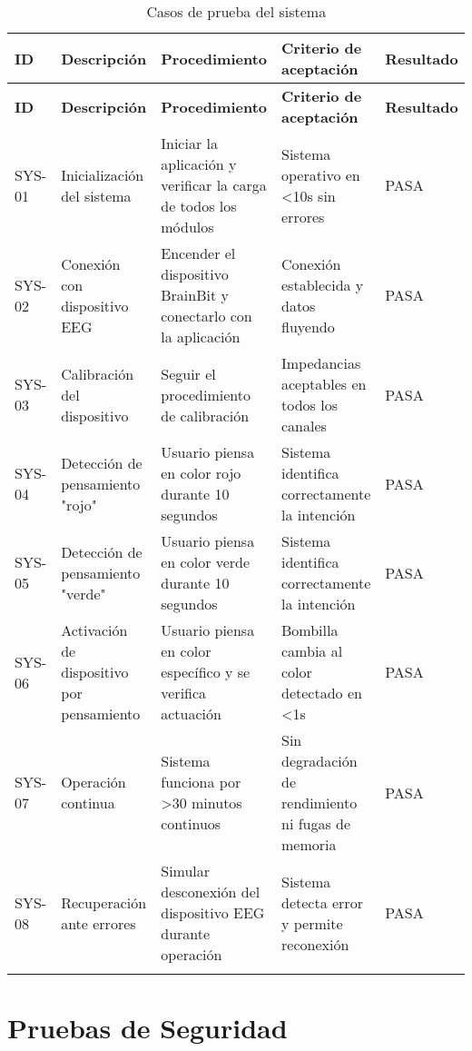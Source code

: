 \begin{center}
\small
\begin{longtable}{|p{1cm}|p{3.5cm}|p{3.5cm}|p{3.5cm}|p{1.5cm}|}
    \hline
    \textbf{ID} & \textbf{Descripción} & \textbf{Procedimiento} & \textbf{Criterio de aceptación} & \textbf{Resultado} \\
    \hline
    \endfirsthead
    \hline
    \textbf{ID} & \textbf{Descripción} & \textbf{Procedimiento} & \textbf{Criterio de aceptación} & \textbf{Resultado} \\
    \hline
    \endhead
    SYS-01 & Inicialización del sistema & Iniciar la aplicación y verificar la carga de todos los módulos & Sistema operativo en <10s sin errores & PASA \\
    \hline
    SYS-02 & Conexión con dispositivo EEG & Encender el dispositivo BrainBit y conectarlo con la aplicación & Conexión establecida y datos fluyendo & PASA \\
    \hline
    SYS-03 & Calibración del dispositivo & Seguir el procedimiento de calibración & Impedancias aceptables en todos los canales & PASA \\
    \hline
    SYS-04 & Detección de pensamiento "rojo" & Usuario piensa en color rojo durante 10 segundos & Sistema identifica correctamente la intención & PASA \\
    \hline
    SYS-05 & Detección de pensamiento "verde" & Usuario piensa en color verde durante 10 segundos & Sistema identifica correctamente la intención & PASA \\
    \hline
    SYS-06 & Activación de dispositivo por pensamiento & Usuario piensa en color específico y se verifica actuación & Bombilla cambia al color detectado en <1s & PASA \\
    \hline
    SYS-07 & Operación continua & Sistema funciona por >30 minutos continuos & Sin degradación de rendimiento ni fugas de memoria & PASA \\
    \hline
    SYS-08 & Recuperación ante errores & Simular desconexión del dispositivo EEG durante operación & Sistema detecta error y permite reconexión & PASA \\
    \hline
    \caption{Casos de prueba del sistema}\label{fig:system_tests}
\end{longtable}
\end{center}


\newpage
\section{Pruebas de Seguridad}

